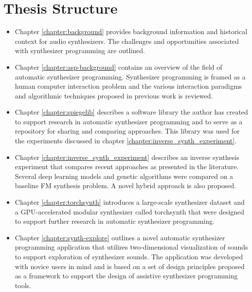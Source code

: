 \section{Thesis Structure}
\begin{itemize}
    \item Chapter \ref{chapter:background} provides background information and historical context for audio synthesizers. The challenges and opportunities associated with synthesizer programming are outlined.
    \item Chapter \ref{chapter:asp-background} contains an overview of the field of automatic synthesizer programming. Synthesizer programming is framed as a human computer interaction problem and the various  interaction paradigms and algorithmic techniques proposed in previous work is reviewed.
    \item Chapter \ref{chapter:spiegelib} describes a software library the author has created to support research in automatic synthesizer programming and to serve as a repository for sharing and comparing approaches. This library was used for the experiments discussed in chapter \ref{chapter:inverse_synth_experiment}.
    \item Chapter \ref{chapter:inverse_synth_experiment} describes an inverse synthesis experiment that compares recent approaches as presented in the literature. Several deep learning models and genetic algorithms were compared on a baseline FM synthesis problem. A novel hybrid approach is also proposed.
    \item Chapter \ref{chapter:torchsynth} introduces a large-scale synthesizer dataset and a GPU-accelerated modular synthesizer called torchsynth that were designed to support further research in automatic synthesizer programming.
    \item Chapter \ref{chapter:synth-explore} outlines a novel automatic synthesizer programming application that utilizes two-dimensional visualization of sounds to support exploration of synthesizer sounds. The application was developed with novice users in mind and is based on a set of design principles proposed as a framework to support the design of assistive synthesizer programming tools.
\end{itemize}

